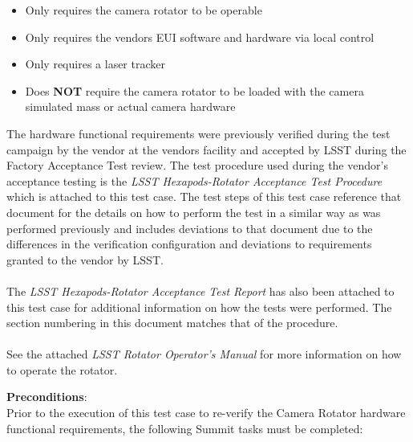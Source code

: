 \documentclass[SE,lsstdraft,STR,toc]{lsstdoc}
\providecommand{\tightlist}{
  \setlength{\itemsep}{0pt}\setlength{\parskip}{0pt}}
\begin{document}
\begin{itemize}
\tightlist
\item
  Only requires the camera rotator to be operable
\item
  Only requires the vendors EUI software and hardware via local control
\item
  Only requires a laser tracker
\item
  Does \textbf{NOT} require the camera rotator to be loaded with the
  camera simulated mass or actual camera hardware
\end{itemize}

The hardware functional requirements were previously verified during the
test campaign by the vendor at the vendors facility and accepted by LSST
during the Factory Acceptance Test review. The test procedure used
during the vendor's acceptance testing is the \emph{LSST
Hexapods-Rotator Acceptance Test Procedure} which is attached to this
test case. The test steps of this test case reference that document for
the details on how to perform the test in a similar way as was performed
previously and includes deviations to that document due to the
differences in the verification configuration and deviations to
requirements granted to the vendor by LSST.\\
~\\
The \emph{LSST Hexapods-Rotator Acceptance Test Report} has also been
attached to this test case for additional information on how the tests
were performed. The section numbering in this document matches that of
the procedure.\\
~\\
See the attached \emph{LSST Rotator Operator's Manual} for more
information on how to operate the rotator.


    \textbf{ Preconditions}:\\
    {Prior to the execution of this test case to re-verify the Camera
Rotator hardware functional requirements, the following Summit tasks
must be completed:}
\end{document}

